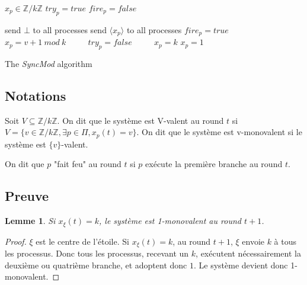 \documentclass{article}
\newtheorem{lemma}{Lemme}
\begin{document}
\begin{algorithm}[htb]
\begin{distribalgo}[1]
\BLANK {}
	\STATE $x_p \in \mathds{Z}/k\mathds{Z}$
	\STATE $try_p = true$
	\STATE $fire_p = false$

\ENDINDENT \BLANK

    \STATE send $\bot$ to all processes
  \ENDINDENT
\ENDINDENT
  \BLANK
{}
    \STATE send $\langle x_p \rangle$ to all processes
  \ENDINDENT
\ENDINDENT
  \BLANK
{}
	\STATE $fire_p = true$ ~~~~
	\STATE $x_p = v+1~mod~k$ ~~~~
	\STATE $try_p = false$ ~~~~
	\STATE $x_p = k$
	\ELSE
	\STATE $x_p = 1$ ~~~~
	\ENDIF
  \ENDINDENT
\ENDINDENT 
\caption{The {\em SyncMod} algorithm} \label{algo:R}
\end{distribalgo}

\end{algorithm}

\subsection{Notations}

Soit $V \subseteq \mathds{Z}/k\mathds{Z}$. On dit que le système est V-valent au round $t$ si $V = \{v \in \mathds{Z}/k\mathds{Z}, \exists p \in \Pi, x_p(t) = v\}$.
On dit que le système est v-monovalent si le système est $\{v\}$-valent.

On dit que $p$ "fait feu" au round $t$ si $p$ exécute la première branche au round $t$.

\subsection{Preuve}

\begin{lemma}
	Si $x_\xi(t) = k$, le système est 1-monovalent au round $t+1$.
\end{lemma}
\begin{proof}
	$\xi$ est le centre de l'étoile.
	Si $x_\xi(t) = k$, au round $t+1$, $\xi$ envoie $k$ à tous les processus. Donc tous les processus, recevant un $k$, exécutent nécessairement la deuxième ou quatrième branche,
	et adoptent donc $1$. Le système devient donc 1-monovalent.
\end{proof}
\end{document}
